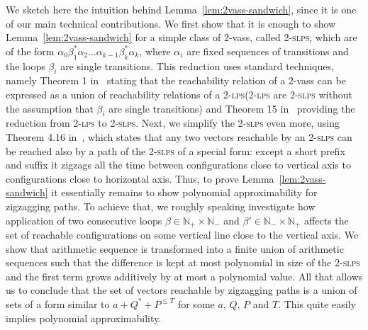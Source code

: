\documentclass[a4paper, UKenglish, cleveref, autoref, thm-restate]{lipics-v2021}
\newcommand{\N}{\mathbb{N}}
\newcommand{\slps}{\textsc{slps}\xspace}
\newcommand{\vass}{{\sc vass}\xspace}
\newcommand{\lps}{\textsc{lps}\xspace}
\newcommand{\dlps}{2-\lps}
\newcommand{\dslps}{2-\slps}
\newcommand{\dvass}{\parvass 2}
\newcommand{\parvass}[1]{{$#1$-\vass}\xspace}
\begin{document}
We sketch here the intuition behind Lemma~\ref{lem:2vass-sandwich}, since
it is one of our main technical contributions. We first show that it is enough to show Lemma~\ref{lem:2vass-sandwich}
for a simple class of \dvass, called \dslps, which are of the form $\alpha_0 \beta_1^* \alpha_2 \ldots \alpha_{k-1} \beta_k^* \alpha_k$,
where $\alpha_i$ are fixed sequences of transitions and the loops $\beta_i$ are single transitions. This reduction uses standard techniques,
namely Theorem 1 in~\cite{BlondinFGHM15} stating that the reachability relation of a \dvass can be expressed as a union of reachability relations of a \dlps (\dlps are \dslps without the assumption that $\beta_i$ are single transitions) and Theorem 15 in~\cite{DBLP:conf/lics/EnglertLT16} providing the reduction from \dlps to \dslps. Next, we simplify the \dslps even more, using 
Theorem 4.16 in~\cite{DBLP:conf/focs/0001CMOSW24}, which states that any two vectors reachable by an \dslps can be reached
also by a path of the \dslps of a special form: except a short prefix and suffix it zigzags all the time between configurations close to vertical axis to configurations close to horizontal axis. Thus, to prove Lemma~\ref{lem:2vass-sandwich}
it essentially remains to show polynomial approximability for zigzagging paths.
To achieve that, we roughly speaking
investigate how application of two consecutive loops $\beta \in \N_+ \times \N_-$ and $\beta' \in \N_- \times \N_+$
affects the set of reachable configurations on some vertical line close to the vertical axis. We show that arithmetic sequence
is transformed into a finite union of arithmetic sequences such that the difference is kept at most polynomial in size of the \dslps
and the first term grows additively by at most a polynomial value. All that allows us to conclude that the set of vectors
reachable by zigzagging paths is a union of sets of a form similar to $a + Q^* + P^{\leq T}$ for some $a$, $Q$, $P$ and $T$.
This quite easily implies polynomial approximability.
\end{document}
